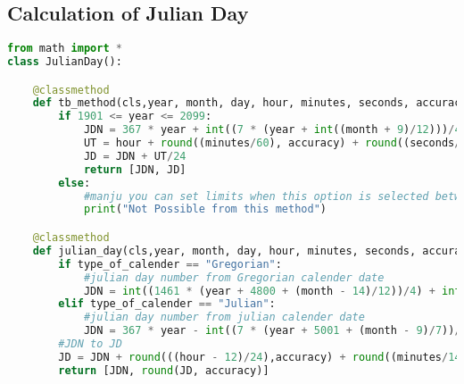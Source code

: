\subsection{Calculation of Julian Day}
\begin{lstlisting}[language=python, caption=CJSD.py]
from math import *
class JulianDay():

    @classmethod
    def tb_method(cls,year, month, day, hour, minutes, seconds, accuracy):
        if 1901 <= year <= 2099:
            JDN = 367 * year + int((7 * (year + int((month + 9)/12)))/4) + int(275 * month/9) + day + 1721013.5
            UT = hour + round((minutes/60), accuracy) + round((seconds/3600), accuracy)
            JD = JDN + UT/24
            return [JDN, JD]
        else:
            #manju you can set limits when this option is selected between 1901 and 2099
            print("Not Possible from this method")

    @classmethod
    def julian_day(cls,year, month, day, hour, minutes, seconds, accuracy,type_of_calender):
        if type_of_calender == "Gregorian":
            #julian day number from Gregorian calender date
            JDN = int((1461 * (year + 4800 + (month - 14)/12))/4) + int((367 * month - 2 - 12 * ((month - 14)/12))/12) - int((3 * ((year + 4900 + (month - 14)/12)/100))/4) + day - 32075
        elif type_of_calender == "Julian":
            #julian day number from julian calender date
            JDN = 367 * year - int((7 * (year + 5001 + (month - 9)/7))/4) + int((275 * month)/9) + day + 1729777
        #JDN to JD
        JD = JDN + round(((hour - 12)/24),accuracy) + round((minutes/1440), accuracy) + round((seconds/86400), accuracy)
        return [JDN, round(JD, accuracy)]

\end{lstlisting}